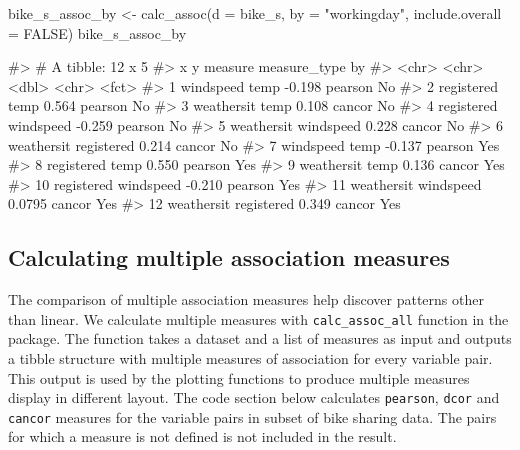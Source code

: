 \begin{Schunk}
\begin{Sinput}
bike_s_assoc_by <- calc_assoc(d = bike_s,
                            by = "workingday",
                            include.overall = FALSE)
bike_s_assoc_by
\end{Sinput}
\begin{Soutput}
#> # A tibble: 12 x 5
#>    x          y          measure measure_type by   
#>    <chr>      <chr>        <dbl> <chr>        <fct>
#>  1 windspeed  temp       -0.198  pearson      No   
#>  2 registered temp        0.564  pearson      No   
#>  3 weathersit temp        0.108  cancor       No   
#>  4 registered windspeed  -0.259  pearson      No   
#>  5 weathersit windspeed   0.228  cancor       No   
#>  6 weathersit registered  0.214  cancor       No   
#>  7 windspeed  temp       -0.137  pearson      Yes  
#>  8 registered temp        0.550  pearson      Yes  
#>  9 weathersit temp        0.136  cancor       Yes  
#> 10 registered windspeed  -0.210  pearson      Yes  
#> 11 weathersit windspeed   0.0795 cancor       Yes  
#> 12 weathersit registered  0.349  cancor       Yes
\end{Soutput}
\end{Schunk}

\hypertarget{calculating-multiple-association-measures}{%
\subsection{Calculating multiple association
measures}\label{calculating-multiple-association-measures}}

The comparison of multiple association measures help discover patterns
other than linear. We calculate multiple measures with
\texttt{calc\_assoc\_all} function in the package. The function takes a
dataset and a list of measures as input and outputs a tibble structure
with multiple measures of association for every variable pair. This
output is used by the plotting functions to produce multiple measures
display in different layout. The code section below calculates
\texttt{pearson}, \texttt{dcor} and \texttt{cancor} measures for the
variable pairs in subset of bike sharing data. The pairs for which a
measure is not defined is not included in the result.


